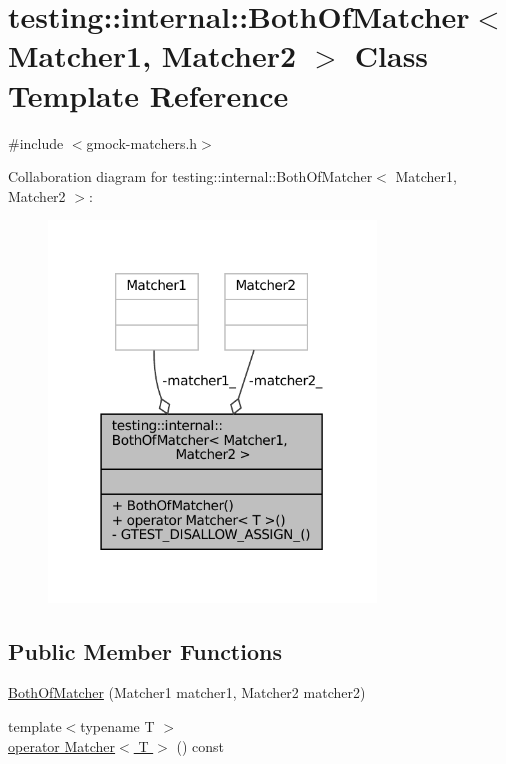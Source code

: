 \hypertarget{classtesting_1_1internal_1_1BothOfMatcher}{}\section{testing\+:\+:internal\+:\+:Both\+Of\+Matcher$<$ Matcher1, Matcher2 $>$ Class Template Reference}
\label{classtesting_1_1internal_1_1BothOfMatcher}


{\ttfamily \#include $<$gmock-\/matchers.\+h$>$}



Collaboration diagram for testing\+:\+:internal\+:\+:Both\+Of\+Matcher$<$ Matcher1, Matcher2 $>$\+:
\nopagebreak
\begin{figure}[H]
\begin{center}
\leavevmode
\includegraphics[width=247pt]{classtesting_1_1internal_1_1BothOfMatcher__coll__graph}
\end{center}
\end{figure}
\subsection*{Public Member Functions}
\begin{DoxyCompactItemize}
\item 
\hyperlink{classtesting_1_1internal_1_1BothOfMatcher_ab7941deda1965521f72d58b0dd429d6a}{Both\+Of\+Matcher} (Matcher1 matcher1, Matcher2 matcher2)
\item 
{\footnotesize template$<$typename T $>$ }\\\hyperlink{classtesting_1_1internal_1_1BothOfMatcher_a5846390364b763fbe31fb11f8c2e3180}{operator Matcher$<$ T $>$} () const
\end{DoxyCompactItemize}
